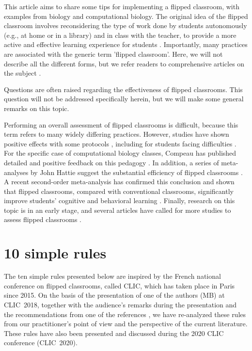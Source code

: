 \documentclass[10pt,letterpaper]{article}
\begin{document}
This article aims to share some tips for implementing a flipped classroom, with examples from biology and computational biology. 
The original idea of the flipped classroom involves reconsidering the type of work done by students autonomously (e.g., at home or in a library) and in class with the teacher, to provide a more active and effective learning experience for students \cite{bergmann_flip_2012,schell_flipping_2015}. 
Importantly, many practices are associated with the generic term 'flipped classroom'.
Here, we will not describe all the different forms, but we refer readers to comprehensive articles on the subject
\cite{bishop_flipped_2013,lebrun_vers_2016}.

Questions are often raised regarding the effectiveness of flipped classrooms. This question will not be addressed specifically herein, but we will make some general remarks on this topic.

Performing an overall assessment of flipped classrooms is difficult, because this term refers to many widely differing practices. However, studies have shown positive effects with some protocols
\cite{casasola_can_2017, crouch_peer_2001, freeman_reply_2014}, including for students facing
difficulties \cite{lage_inverting_2000}. For the specific case of computational biology classes, 
Compeau has published detailed and positive feedback on this pedagogy \cite{compeau_establishing_2019}.
In addition, a series of meta-analyses by John Hattie \cite{hattie2014, hattie2018} suggest the substantial efficiency of flipped classrooms
\cite{chen_academic_2019,hew_flipped_2018,karagol_effect_2019,tan_effectiveness_2017}. 
A recent second-order meta-analysis has confirmed this conclusion and shown that flipped classrooms, compared with conventional classrooms,
significantly improve students’ cognitive and behavioral learning \cite{hew_does_2020}.
Finally, research on this topic is in an early stage, and several articles have called for more studies to assess
flipped classrooms 
\cite{abeysekera_motivation_2015,bishop_flipped_2013,hew_does_2020,lo_critical_2017}.


\section{10 simple rules}

The ten simple rules presented below are inspired by the French national conference on flipped classrooms, called CLIC, which has taken place 
in Paris since 2015. On the basis of the presentation of one of the authors (MB) at CLIC~2018, together with the audience’s remarks 
during the presentation and the recommendations from one of the references \cite{lo_critical_2017}, we have re-analyzed these rules from our practitioner's point of view and the perspective of the current literature.
These rules have also been presented and discussed during the 2020 CLIC conference (CLIC~2020).
\end{document}
